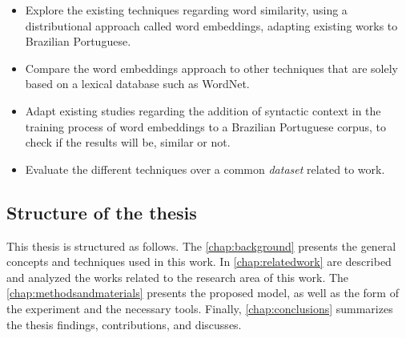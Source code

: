 \begin{itemize}
    \item Explore the existing techniques regarding word similarity, using a distributional approach called word embeddings, adapting existing works to Brazilian Portuguese.
    \item Compare the word embeddings approach to other techniques that are solely based on a lexical database such as WordNet.
    \item Adapt existing studies regarding the addition of syntactic context in the training process of word embeddings to a Brazilian Portuguese corpus, to check if the results will be, similar or not. 
    \item Evaluate the different techniques over a common \textit{dataset} related to  work.
\end{itemize}

\subsection{Structure of the thesis}

This thesis is structured as follows. The \autoref{chap:background} presents the general concepts and techniques used in this work. In \autoref{chap:relatedwork} are described and analyzed the works related to the research area of this work. The \autoref{chap:methodsandmaterials} presents the proposed model, as well as the form of the experiment and the necessary tools. 
Finally, \autoref{chap:conclusions} summarizes the thesis findings, contributions, and discusses.


